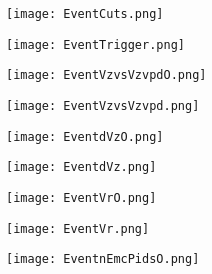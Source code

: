 \documentclass{beamer}
\begin{document}
\begin{frame}
	\begin{figure}[h!]
		\centering
		\texttt{[image: EventCuts.png]}
	\end{figure}
\end{frame}

\begin{frame}
	\begin{figure}[h!]
		\centering
		\texttt{[image: EventTrigger.png]}
	\end{figure}
\end{frame}

\begin{frame}
 	\begin{figure}[h!]
	\centering
	\texttt{[image: EventVzvsVzvpdO.png]}
	\end{figure}
\end{frame}

\begin{frame}
 	\begin{figure}[h!]
	\centering
	\texttt{[image: EventVzvsVzvpd.png]}
	\end{figure}
\end{frame}

\begin{frame}
 	\begin{figure}[h!]
	\centering
	\texttt{[image: EventdVzO.png]}
	\end{figure}
\end{frame}

\begin{frame}
 	\begin{figure}[h!]
	\centering
	\texttt{[image: EventdVz.png]}
	\end{figure}
\end{frame}

\begin{frame}
 	\begin{figure}[h!]
	\centering
	\texttt{[image: EventVrO.png]}
	\end{figure}
\end{frame}

\begin{frame}
 	\begin{figure}[h!]
	\centering
	\texttt{[image: EventVr.png]}
	\end{figure}
\end{frame}

\begin{frame}
 	\begin{figure}[h!]
	\centering
	\texttt{[image: EventnEmcPidsO.png]}
	\end{figure}
\end{frame}
\end{document}
